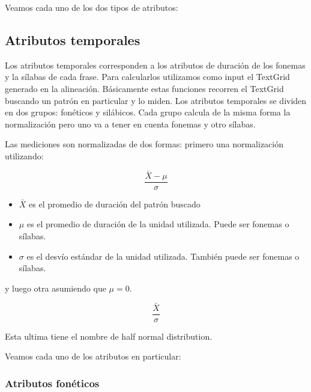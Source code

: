Veamos cada uno de los dos tipos de atributos:

\subsection{Atributos temporales}

Los atributos temporales corresponden a los atributos de duración de los fonemas y la sílabas de cada frase. Para calcularlos utilizamos como input el TextGrid generado en la alineación. Básicamente estas funciones recorren el TextGrid buscando un patrón en particular y lo miden. Los atributos temporales se dividen en dos grupos: fonéticos y silábicos. Cada grupo calcula de la misma forma la normalización pero uno va a tener en cuenta fonemas y otro sílabas. 

Las mediciones son normalizadas de dos formas: primero una normalización utilizando:

\hspace{2cm} \[\frac{ \bar{X} - \mu }{ \sigma }\]

\begin{itemize}
	\item $\bar{X}$ es el promedio de duración del patrón buscado
	\item $\mu$ es el promedio de duración de la unidad utilizada. Puede ser fonemas o sílabas.
	\item $\sigma$ es el desvío estándar de la unidad utilizada. También puede ser fonemas o sílabas.
\end{itemize}

y luego otra asumiendo que $\mu = 0$. 

\hspace{2cm} \[\frac{ \bar{X} }{ \sigma }\]

Esta ultima tiene el nombre de half normal distribution.


Veamos cada uno de los atributos en particular:

\subsubsection{Atributos fonéticos}

